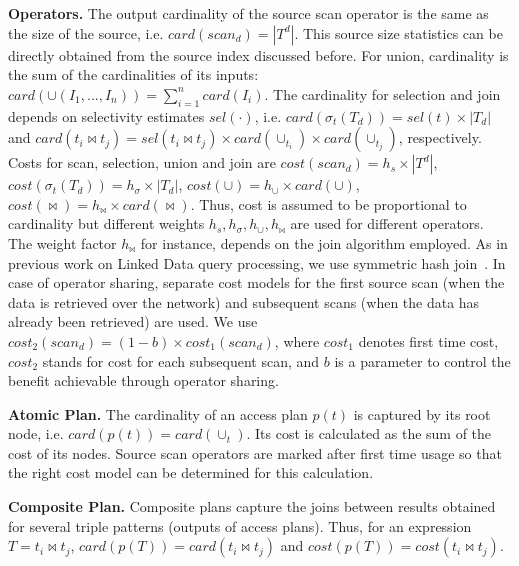 \textbf{Operators.} The output cardinality of the source scan operator is the same as the size of the source, i.e. $card(scan_d) = |T^d|$. 
This source size statistics can be directly obtained from the source index discussed before. 
For union, cardinality is the sum of the cardinalities of its inputs: $card(\cup(I_1,...,I_n)) = \sum_{i=1}^n card(I_i)$. 
The cardinality for selection and join depends on selectivity estimates $sel(\cdot)$, i.e. $card(\sigma_t(T_d)) = sel(t) \times |T_d|$ and $card(t_i \Join t_j) =
sel(t_i \Join t_j) \times card(\cup_{t_i}) \times card(\cup_{t_j})$, respectively. 
Costs for scan, selection, union and join are $cost(scan_d) = h_s \times |T^d|$, $cost(\sigma_t(T_d))=h_\sigma \times |T_d|$, $cost(\cup) =
h_\cup \times card(\cup)$, $cost(\Join) =
h_\Join \times card(\Join)$. Thus, cost is assumed to be proportional to cardinality but different weights $h_s,h_\sigma,h_\cup,h_\Join$ are used for different operators. The weight factor $h_\Join$ for instance, depends on the
join algorithm employed. As in previous work on Linked Data query processing, we use symmetric hash join~\cite{ladwig_linked_2010,sihjoin_2011}. In case of operator sharing, separate cost
models for the first source scan (when the data is retrieved over the
network) and subsequent scans (when the data has already been
retrieved) are used. We use $cost_2(scan_d) = (1 - b) \times cost_1(scan_d)$, where $cost_1$ denotes first time cost, $cost_2$ stands for cost for each subsequent scan, and $b$
is a parameter to control the benefit achievable through operator sharing.


\textbf{Atomic Plan.} The cardinality of an access plan $p(t)$ is captured by its root node, i.e. $card(p(t)) = card(\cup_t)$. Its cost is calculated as the sum of the cost of its nodes. Source scan operators are marked after first time usage so that the right cost model can be determined for this calculation. 

\textbf{Composite Plan.} Composite plans capture the joins between results obtained for several triple patterns (outputs of access plans). Thus, for an expression $T = t_i\Join t_j$, $card(p(T))  = card(t_i\Join t_j)$ and $cost(p(T))  = cost(t_i\Join t_j)$.


